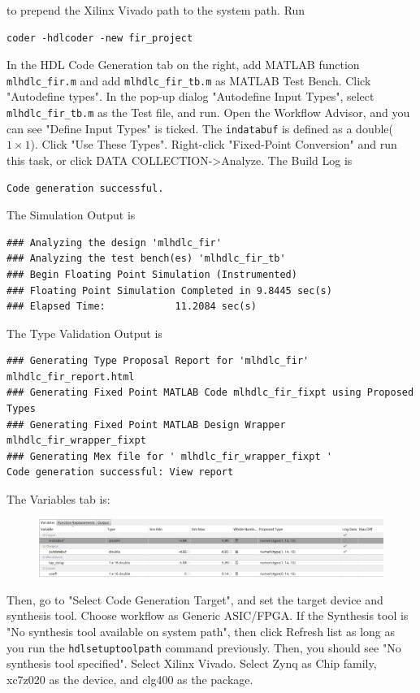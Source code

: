 \documentclass[a4paper,12pt,twoside]{article}
\begin{document}
to prepend the Xilinx Vivado path to the system path. Run
\begin{verbatim}
coder -hdlcoder -new fir_project
\end{verbatim}
In the HDL Code Generation tab on the right, add MATLAB function \texttt{mlhdlc\_fir.m} and add \texttt{mlhdlc\_fir\_tb.m} as MATLAB Test Bench. Click "Autodefine types". In the pop-up dialog "Autodefine Input Types", select \texttt{mlhdlc\_fir\_tb.m} as the Test file, and run. Open the Workflow Advisor, and you can see "Define Input Types" is ticked. The \texttt{indatabuf} is defined as a double($1\times1$). Click "Use These Types". Right-click "Fixed-Point Conversion" and run this task, or click DATA COLLECTION->Analyze. The Build Log is
\begin{verbatim}
Code generation successful.
\end{verbatim}
The Simulation Output is
\begin{verbatim}
### Analyzing the design 'mlhdlc_fir'
### Analyzing the test bench(es) 'mlhdlc_fir_tb'
### Begin Floating Point Simulation (Instrumented)
### Floating Point Simulation Completed in 9.8445 sec(s)
### Elapsed Time:            11.2084 sec(s)
\end{verbatim}
The Type Validation Output is
\begin{verbatim}
### Generating Type Proposal Report for 'mlhdlc_fir' mlhdlc_fir_report.html
### Generating Fixed Point MATLAB Code mlhdlc_fir_fixpt using Proposed Types
### Generating Fixed Point MATLAB Design Wrapper mlhdlc_fir_wrapper_fixpt
### Generating Mex file for ' mlhdlc_fir_wrapper_fixpt '
Code generation successful: View report
\end{verbatim}
The Variables tab is:
\begin{figure}[H]
    \centering
    \includegraphics[width=\textwidth]{images/29.png}
\end{figure}
Then, go to "Select Code Generation Target", and set the target device and synthesis tool. Choose workflow as Generic ASIC/FPGA. If the Synthesis tool is "No synthesis tool available on system path", then click Refresh list as long as you run the \texttt{hdlsetuptoolpath} command previously. Then, you should see "No synthesis tool specified". Select Xilinx Vivado. Select Zynq as Chip family, xc7z020 as the device, and clg400 as the package.
\end{document}
